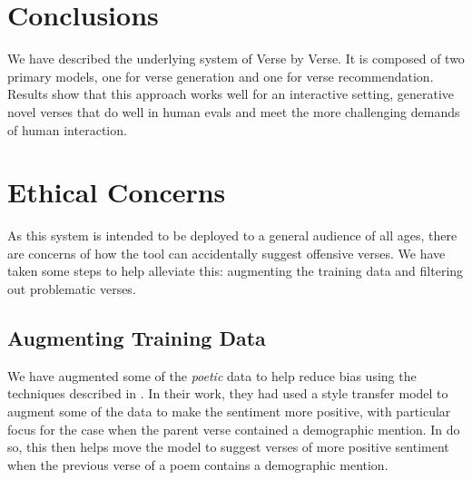 \documentclass[11pt]{article}
\begin{document}




\section{Conclusions}

We have described the underlying system of Verse by Verse.
It is composed of two primary models, one for verse generation and one for verse recommendation.
Results show that this approach works well for an interactive setting, generative novel verses that do well in human evals and meet the more challenging demands of human interaction.

\section*{Ethical Concerns}

As this system is intended to be deployed to a general audience of all ages, there are concerns of how the tool can accidentally suggest offensive verses.
We have taken some steps to help alleviate this: augmenting the training data and filtering out problematic verses.

\subsection*{Augmenting Training Data}

We have augmented some of the \textit{poetic} data to help reduce bias using the techniques described in .
In their work, they had used a style transfer model to augment some of the data to make the sentiment more positive, with particular focus for the case when the parent verse contained a demographic mention.
In do so, this then helps move the model to suggest verses of more positive sentiment when the previous verse of a poem contains a demographic mention.
\end{document}
